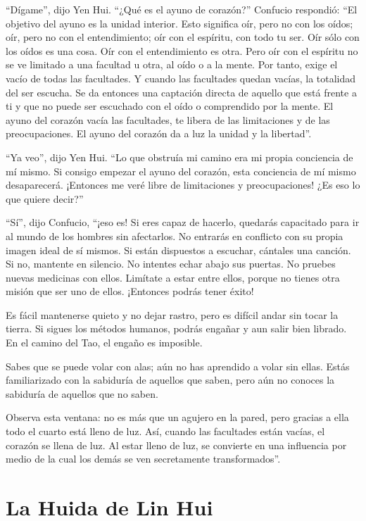 \documentclass[book,b5paper,hidelinks,final]{memoir}
\begin{document}
	``Dígame'', dijo Yen Hui. ``¿Qué es el ayuno de corazón?'' Confucio
	respondió: ``El objetivo del ayuno es la unidad interior. Esto significa
	oír, pero no con los oídos; oír, pero no con el entendimiento; oír con
	el espíritu, con todo tu ser. Oír sólo con los oídos es una cosa. Oír
	con el entendimiento es otra. Pero oír con el espíritu no se ve limitado
	a una facultad u otra, al oído o a la mente. Por tanto, exige el vacío
	de todas las facultades. Y cuando las facultades quedan vacías, la
	totalidad del ser escucha. Se da entonces una captación directa de
	aquello que está frente a ti y que no puede ser escuchado con el oído o
	comprendido por la mente. El ayuno del corazón vacía las facultades, te
	libera de las limitaciones y de las preocupaciones. El ayuno del corazón
	da a luz la unidad y la libertad''.
	
	``Ya veo'', dijo Yen Hui. ``Lo que obstruía mi camino era mi propia
	conciencia de mí mismo. Si consigo empezar el ayuno del corazón, esta
	conciencia de mí mismo desaparecerá. ¡Entonces me veré libre de
	limitaciones y preocupaciones! ¿Es eso lo que quiere decir?''
	
	``Sí'', dijo Confucio, ``¡eso es! Si eres capaz de hacerlo, quedarás
	capacitado para ir al mundo de los hombres sin afectarlos. No entrarás
	en conflicto con su propia imagen ideal de sí mismos. Si están
	dispuestos a escuchar, cántales una canción. Si no, mantente en
	silencio. No intentes echar abajo sus puertas. No pruebes nuevas
	medicinas con ellos. Limítate a estar entre ellos, porque no tienes otra
	misión que ser uno de ellos. ¡Entonces podrás tener éxito!
	
	Es fácil mantenerse quieto y no dejar rastro, pero es difícil andar sin
	tocar la tierra. Si sigues los métodos humanos, podrás engañar y aun
	salir bien librado. En el camino del Tao, el engaño es imposible.
	
	Sabes que se puede volar con alas; aún no has aprendido a volar sin
	ellas. Estás familiarizado con la sabiduría de aquellos que saben, pero
	aún no conoces la sabiduría de aquellos que no saben.
	
	Observa esta ventana: no es más que un agujero en la pared, pero gracias
	a ella todo el cuarto está lleno de luz. Así, cuando las facultades
	están vacías, el corazón se llena de luz. Al estar lleno de luz, se
	convierte en una influencia por medio de la cual los demás se ven
	secretamente transformados''.
	
	\chapter*{La Huida de Lin Hui}
	
\end{document}
